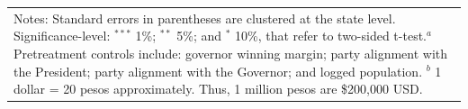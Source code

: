 \documentclass[12pt]{amsart}
\numberwithin{equation}{section}
\theoremstyle{definition}
\theoremstyle{definition}
\theoremstyle{definition}
\begin{document}
\begin{appendix}
\begin{table}[htbp]
{\begin{tabular}{l*{6}{c}}
    
 
      
\hline \hline 
\multicolumn{7}{p{1.4\textwidth}}{\footnotesize{Notes: Standard errors in parentheses are clustered at the state level. Significance-level: $^{***}$ 1\%; $^{**}$ 5\%; and $^*$ 10\%, that refer to two-sided t-test.$^a$ Pretreatment controls include: governor winning margin; party alignment with the President;  party alignment with the Governor; and logged population. $^b$ 1 dollar = 20 pesos approximately. Thus, 1 million pesos are \$200,000 USD.}} \\
\end{tabular}
}
\end{table}  


        
\begin{table}[htbp]\def\sym#1{\ifmmode^{#1}\else\(^{#1}\)\fi}
\centering
\caption{Revenues of Municipal Governments, Difference-in-Discontinuity of Close Elections Model}
\label{tab:revenues}
\end{table}
\end{appendix}
\end{document}
